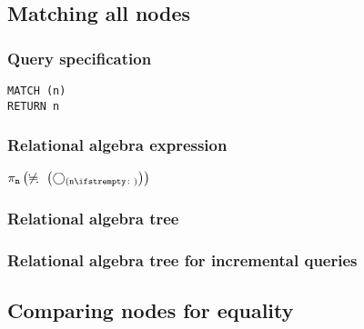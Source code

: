 \subsection{Matching all nodes}

\subsubsection*{Query specification}

\begin{lstlisting}
MATCH (n)
RETURN n
\end{lstlisting}

\subsubsection*{Relational algebra expression}

$\projection{\var{n}} \left(\alldifferent{} \left(\getvertices{n}{}\right)\right)$

\subsubsection*{Relational algebra tree}


\subsubsection*{Relational algebra tree for incremental queries}


\subsection{Comparing nodes for equality}

